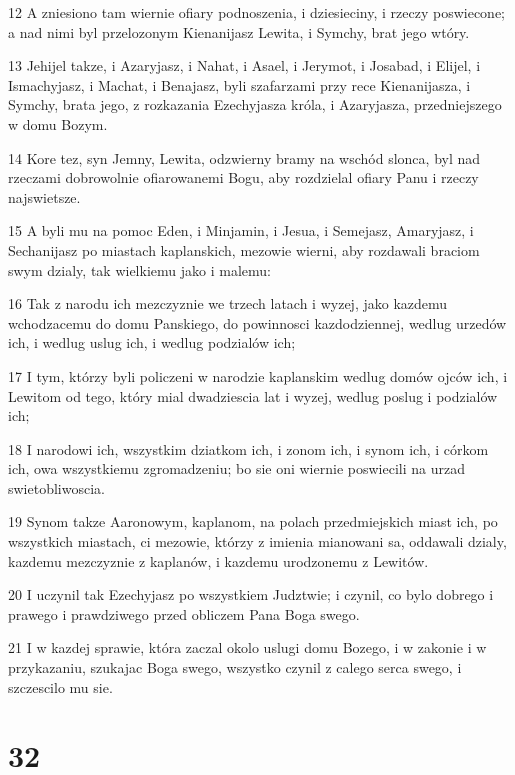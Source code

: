 \par 12 A zniesiono tam wiernie ofiary podnoszenia, i dziesieciny, i rzeczy poswiecone; a nad nimi byl przelozonym Kienanijasz Lewita, i Symchy, brat jego wtóry.
\par 13 Jehijel takze, i Azaryjasz, i Nahat, i Asael, i Jerymot, i Josabad, i Elijel, i Ismachyjasz, i Machat, i Benajasz, byli szafarzami przy rece Kienanijasza, i Symchy, brata jego, z rozkazania Ezechyjasza króla, i Azaryjasza, przedniejszego w domu Bozym.
\par 14 Kore tez, syn Jemny, Lewita, odzwierny bramy na wschód slonca, byl nad rzeczami dobrowolnie ofiarowanemi Bogu, aby rozdzielal ofiary Panu i rzeczy najswietsze.
\par 15 A byli mu na pomoc Eden, i Minjamin, i Jesua, i Semejasz, Amaryjasz, i Sechanijasz po miastach kaplanskich, mezowie wierni, aby rozdawali braciom swym dzialy, tak wielkiemu jako i malemu:
\par 16 Tak z narodu ich mezczyznie we trzech latach i wyzej, jako kazdemu wchodzacemu do domu Panskiego, do powinnosci kazdodziennej, wedlug urzedów ich, i wedlug uslug ich, i wedlug podzialów ich;
\par 17 I tym, którzy byli policzeni w narodzie kaplanskim wedlug domów ojców ich, i Lewitom od tego, który mial dwadziescia lat i wyzej, wedlug poslug i podzialów ich;
\par 18 I narodowi ich, wszystkim dziatkom ich, i zonom ich, i synom ich, i córkom ich, owa wszystkiemu zgromadzeniu; bo sie oni wiernie poswiecili na urzad swietobliwoscia.
\par 19 Synom takze Aaronowym, kaplanom, na polach przedmiejskich miast ich, po wszystkich miastach, ci mezowie, którzy z imienia mianowani sa, oddawali dzialy, kazdemu mezczyznie z kaplanów, i kazdemu urodzonemu z Lewitów.
\par 20 I uczynil tak Ezechyjasz po wszystkiem Judztwie; i czynil, co bylo dobrego i prawego i prawdziwego przed obliczem Pana Boga swego.
\par 21 I w kazdej sprawie, która zaczal okolo uslugi domu Bozego, i w zakonie i w przykazaniu, szukajac Boga swego, wszystko czynil z calego serca swego, i szczescilo mu sie.

\chapter{32}

